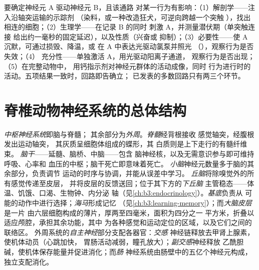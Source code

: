 \begin{method}[追踪神经回路]\label{met:b3:nervous-systems:tracing}
要确定神经元 A 驱动神经元 B，且该通路
对某一行为有影响：（1）解剖学——注入沿轴突运输的示踪剂
（染料，或一种改造狂犬，可逆向跨越一个突触
），找出相连的细胞；（2）生理学——在记录 B 的同时
刺激 A，并测量潜伏期（单突触连接
给出约一毫秒的固定延迟），以及性质（兴奋或
抑制）；（3）必要性——使 A 沉默，可通过损毁、降温，或
在 A 中表达光驱动氯泵并照光
（\emph{}），观察行为是否失效；（4）
充分性——单独激活 A，用光驱动阳离子通道，
观察行为是否出现；（5）在完整动物中，
用钙指示剂对神经元群体的活动成像，同时
行为进行时的活动。五项结果一致时，回路即告确立；
已发表的多数回路只有两三个环节。
\end{method}

\section{脊椎动物神经系统的总体结构}

\begin{definition}[中枢与外周部分]\label{def:b3:nervous-systems:plan}
\emph{中枢神经系统}即脑与脊髓；
其余部分为\emph{外周}。\emph{脊髓}经背根接收
感觉轴突，经腹根发出运动轴突，
其灰质呈细胞体组成的蝶形，其
白质则是上下走行的有髓纤维束。
\emph{脑干}——延髓、脑桥、中脑——包含
脑神经核，以及无需意识参与即可维持呼吸、心率和
血压的中枢；脑干死亡即意味着死亡。
\emph{小脑}神经元数量多于脑的其余部分，负责调节
运动的时序与协调，并能从误差中学习。
\emph{丘脑}将除嗅觉外的所有感觉传递至皮层，
并将皮层的反馈送回；位于其下方的\emph{下丘脑}
主管稳态——体温、饥饿、口渴、生物钟、内分泌
轴（见\cref{ch:b3:endocrinology}）。\emph{基底}负责从
可能的动作中进行选择；\emph{海马}形成记忆
（见\cref{ch:b3:learning-memory}）；而\emph{大脑皮层}是一片
由六层细胞构成的薄片，厚两至四毫米，面积为四分之一
平方米，折叠以适应颅腔，承担其余功能，其中
为各种感觉和运动定位的区域，以及它们之间的联络区。
外周系统的\emph{自主神经}部分支配各器官：\emph{交感}
神经链释放去甲肾上腺素，使机体动员（心跳加快，
胃肠活动减弱，瞳孔放大）；\emph{副交感}神经释放
乙酰胆碱，使机体保存能量并促进消化；而\emph{肠}
神经系统由肠壁中的五亿个神经元构成，
独立支配消化。
\end{definition}

